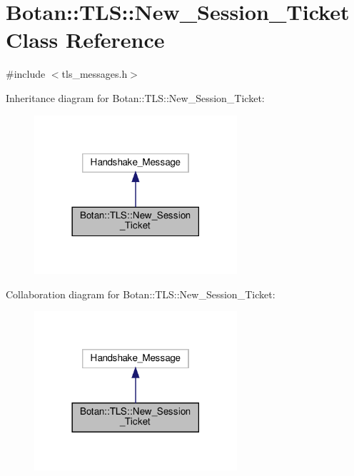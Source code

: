\hypertarget{class_botan_1_1_t_l_s_1_1_new___session___ticket}{}\section{Botan\+:\+:T\+LS\+:\+:New\+\_\+\+Session\+\_\+\+Ticket Class Reference}
\label{class_botan_1_1_t_l_s_1_1_new___session___ticket}


{\ttfamily \#include $<$tls\+\_\+messages.\+h$>$}



Inheritance diagram for Botan\+:\+:T\+LS\+:\+:New\+\_\+\+Session\+\_\+\+Ticket\+:
\nopagebreak
\begin{figure}[H]
\begin{center}
\leavevmode
\includegraphics[width=213pt]{class_botan_1_1_t_l_s_1_1_new___session___ticket__inherit__graph}
\end{center}
\end{figure}


Collaboration diagram for Botan\+:\+:T\+LS\+:\+:New\+\_\+\+Session\+\_\+\+Ticket\+:
\nopagebreak
\begin{figure}[H]
\begin{center}
\leavevmode
\includegraphics[width=213pt]{class_botan_1_1_t_l_s_1_1_new___session___ticket__coll__graph}
\end{center}
\end{figure}
